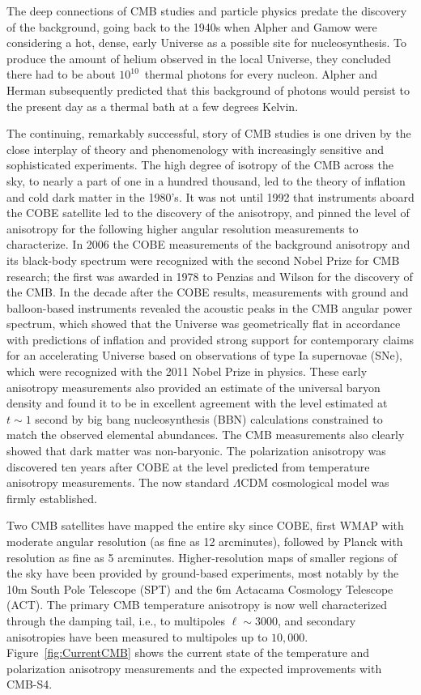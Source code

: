 The deep connections of CMB studies and particle physics predate the discovery of the background, going back to the 1940s when Alpher and Gamow were considering a hot, dense, early Universe as a possible site for nucleosynthesis. To produce the
amount of helium observed in the local Universe, they concluded there
had to be about $10^{10}$\ thermal photons for every nucleon. Alpher and Herman subsequently predicted that this background of photons would persist to the present day as a thermal bath at a few degrees Kelvin.

The continuing, remarkably successful, story of CMB studies is one driven by the close interplay of theory and phenomenology with increasingly sensitive and sophisticated experiments. The high degree of isotropy of the CMB across the sky, to nearly a part of one in a hundred thousand, led to the theory of inflation and cold dark matter in the 1980's. It was not until 1992 that instruments aboard the COBE satellite led to the discovery of the anisotropy, and pinned the level of anisotropy for the following higher angular resolution measurements to characterize. In 2006 the COBE measurements of the background anisotropy and its black-body spectrum were recognized with the second Nobel Prize for CMB research; the first was awarded in 1978 to Penzias and Wilson for the discovery of the CMB.  In the decade after the COBE results, measurements with ground and balloon-based instruments revealed the acoustic peaks in the CMB angular power spectrum, which showed that the Universe was geometrically flat in accordance with predictions of inflation and provided strong support for contemporary claims for an accelerating Universe based on observations of type Ia supernovae (SNe), which were recognized with the 2011 Nobel Prize in physics. These early anisotropy measurements also provided an estimate of the universal baryon density and found it to be in excellent agreement with the level estimated at $t \sim 1$ second by big bang nucleosynthesis (BBN) calculations constrained to match the observed elemental abundances. The CMB measurements also clearly showed that dark matter was non-baryonic. The polarization anisotropy was discovered ten years after COBE at the level predicted from temperature anisotropy measurements. The now standard $\Lambda$CDM cosmological model was firmly established.

Two CMB satellites have mapped the entire sky since COBE, first WMAP with moderate angular resolution (as fine as 12 arcminutes), followed by Planck with resolution as fine as 5 arcminutes. Higher-resolution maps of smaller regions of the sky have been provided by ground-based experiments, most notably by the 10m South Pole Telescope (SPT) and the 6m Actacama Cosmology Telescope (ACT). The primary CMB temperature anisotropy is now well characterized through the damping tail, i.e., to multipoles $\ell \sim 3000$, and secondary anisotropies have been measured to multipoles up to  $10,000$.  Figure~\ref{fig:CurrentCMB} shows the current state of the temperature and polarization anisotropy measurements and the expected improvements with CMB-S4.



